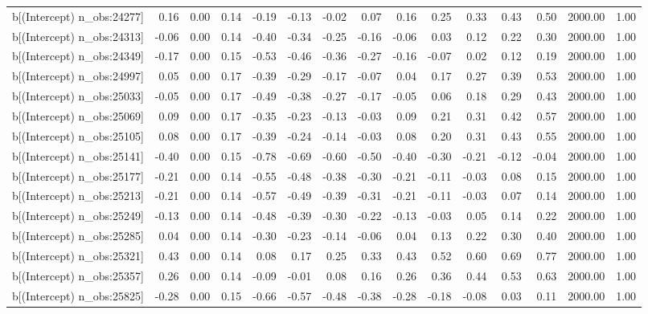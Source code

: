 \begin{table}[ht]
\begin{tabular}{rrrrrrrrrrrrrrr}
  b[(Intercept) n\_obs:24277] & 0.16 & 0.00 & 0.14 & -0.19 & -0.13 & -0.02 & 0.07 & 0.16 & 0.25 & 0.33 & 0.43 & 0.50 & 2000.00 & 1.00 \\ 
  b[(Intercept) n\_obs:24313] & -0.06 & 0.00 & 0.14 & -0.40 & -0.34 & -0.25 & -0.16 & -0.06 & 0.03 & 0.12 & 0.22 & 0.30 & 2000.00 & 1.00 \\ 
  b[(Intercept) n\_obs:24349] & -0.17 & 0.00 & 0.15 & -0.53 & -0.46 & -0.36 & -0.27 & -0.16 & -0.07 & 0.02 & 0.12 & 0.19 & 2000.00 & 1.00 \\ 
  b[(Intercept) n\_obs:24997] & 0.05 & 0.00 & 0.17 & -0.39 & -0.29 & -0.17 & -0.07 & 0.04 & 0.17 & 0.27 & 0.39 & 0.53 & 2000.00 & 1.00 \\ 
  b[(Intercept) n\_obs:25033] & -0.05 & 0.00 & 0.17 & -0.49 & -0.38 & -0.27 & -0.17 & -0.05 & 0.06 & 0.18 & 0.29 & 0.43 & 2000.00 & 1.00 \\ 
  b[(Intercept) n\_obs:25069] & 0.09 & 0.00 & 0.17 & -0.35 & -0.23 & -0.13 & -0.03 & 0.09 & 0.21 & 0.31 & 0.42 & 0.57 & 2000.00 & 1.00 \\ 
  b[(Intercept) n\_obs:25105] & 0.08 & 0.00 & 0.17 & -0.39 & -0.24 & -0.14 & -0.03 & 0.08 & 0.20 & 0.31 & 0.43 & 0.55 & 2000.00 & 1.00 \\ 
  b[(Intercept) n\_obs:25141] & -0.40 & 0.00 & 0.15 & -0.78 & -0.69 & -0.60 & -0.50 & -0.40 & -0.30 & -0.21 & -0.12 & -0.04 & 2000.00 & 1.00 \\ 
  b[(Intercept) n\_obs:25177] & -0.21 & 0.00 & 0.14 & -0.55 & -0.48 & -0.38 & -0.30 & -0.21 & -0.11 & -0.03 & 0.08 & 0.15 & 2000.00 & 1.00 \\ 
  b[(Intercept) n\_obs:25213] & -0.21 & 0.00 & 0.14 & -0.57 & -0.49 & -0.39 & -0.31 & -0.21 & -0.11 & -0.03 & 0.07 & 0.14 & 2000.00 & 1.00 \\ 
  b[(Intercept) n\_obs:25249] & -0.13 & 0.00 & 0.14 & -0.48 & -0.39 & -0.30 & -0.22 & -0.13 & -0.03 & 0.05 & 0.14 & 0.22 & 2000.00 & 1.00 \\ 
  b[(Intercept) n\_obs:25285] & 0.04 & 0.00 & 0.14 & -0.30 & -0.23 & -0.14 & -0.06 & 0.04 & 0.13 & 0.22 & 0.30 & 0.40 & 2000.00 & 1.00 \\ 
  b[(Intercept) n\_obs:25321] & 0.43 & 0.00 & 0.14 & 0.08 & 0.17 & 0.25 & 0.33 & 0.43 & 0.52 & 0.60 & 0.69 & 0.77 & 2000.00 & 1.00 \\ 
  b[(Intercept) n\_obs:25357] & 0.26 & 0.00 & 0.14 & -0.09 & -0.01 & 0.08 & 0.16 & 0.26 & 0.36 & 0.44 & 0.53 & 0.63 & 2000.00 & 1.00 \\ 
  b[(Intercept) n\_obs:25825] & -0.28 & 0.00 & 0.15 & -0.66 & -0.57 & -0.48 & -0.38 & -0.28 & -0.18 & -0.08 & 0.03 & 0.11 & 2000.00 & 1.00 \\ 

\end{tabular}
\end{table}
